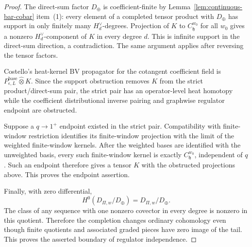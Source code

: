 \begin{proof}
  The direct-sum factor \(D_{\oplus}\) is coefficient-finite by
  Lemma~\ref{lem:continuous-bar-cobar} item~(1): every element of a
  completed tensor product with \(D_{\oplus}\) has support in only
  finitely many \(H_d^\vee\)-degrees.  Projection of \(K\) to
  \(C^{w_0}_{\mathfrak h}\) for all \(w_0\) gives a nonzero
  \(H_d^\vee\)-component of \(K\) in every degree \(d\).  This is
  infinite support in the direct-sum direction, a contradiction.  The
  same argument applies after reversing the tensor factors.

  Costello's heat-kernel BV propagator for the cotangent coefficient
  field is \(P_{\epsilon,L}^{\mathrm{base}}\widehat\otimes K\).  Since
  the support obstruction removes \(K\) from the strict
  product/direct-sum pair, the strict pair has an operator-level heat
  homotopy while the coefficient distributional inverse pairing and
  graphwise regulator endpoint are obstructed.

  Suppose a \(q\to1^+\) endpoint existed in the strict pair.  Compatibility
  with finite-window restriction identifies its finite-window projection
  with the limit of the weighted finite-window kernels.  After the
  weighted bases are identified with the unweighted basis, every such
  finite-window kernel is exactly \(C^{w_0}_{\mathfrak h}\), independent
  of \(q\).  Such an endpoint therefore gives a tensor \(K\) with the
  obstructed projections above.
  This proves the endpoint assertion.

  Finally, with zero differential,
  \[
    H^0(D_{\Pi,w}/D_{\oplus})=D_{\Pi,w}/D_{\oplus}.
  \]
  The class of any sequence with one nonzero covector in every degree
  is nonzero in this quotient.  Therefore the completion changes
  ordinary cohomology even though finite quotients and associated
  graded pieces have zero image of the tail.  This proves the asserted
  boundary of regulator independence.
\end{proof}

